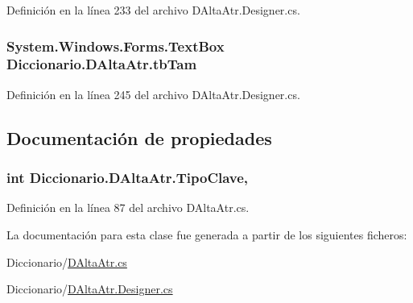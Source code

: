 Definición en la línea 233 del archivo D\-Alta\-Atr.\-Designer.\-cs.

\hypertarget{class_diccionario_1_1_d_alta_atr_a9723653c62ae5e988320eba88ba88ebe}{
\subsubsection[{tb\-Tam}]{\setlength{\rightskip}{0pt plus 5cm}System.\-Windows.\-Forms.\-Text\-Box Diccionario.\-D\-Alta\-Atr.\-tb\-Tam}}\label{class_diccionario_1_1_d_alta_atr_a9723653c62ae5e988320eba88ba88ebe}


Definición en la línea 245 del archivo D\-Alta\-Atr.\-Designer.\-cs.



\subsection{Documentación de propiedades}
\hypertarget{class_diccionario_1_1_d_alta_atr_a9ba766b3a2dbc56127740e6e93fe40fa}{
\subsubsection[{Tipo\-Clave}]{\setlength{\rightskip}{0pt plus 5cm}int Diccionario.\-D\-Alta\-Atr.\-Tipo\-Clave\hspace{0.3cm}{\ttfamily [get]}, {\ttfamily [set]}}}\label{class_diccionario_1_1_d_alta_atr_a9ba766b3a2dbc56127740e6e93fe40fa}


Definición en la línea 87 del archivo D\-Alta\-Atr.\-cs.



La documentación para esta clase fue generada a partir de los siguientes ficheros\-:\begin{DoxyCompactItemize}
\item 
Diccionario/\hyperlink{_d_alta_atr_8cs}{D\-Alta\-Atr.\-cs}\item 
Diccionario/\hyperlink{_d_alta_atr_8_designer_8cs}{D\-Alta\-Atr.\-Designer.\-cs}\end{DoxyCompactItemize}
